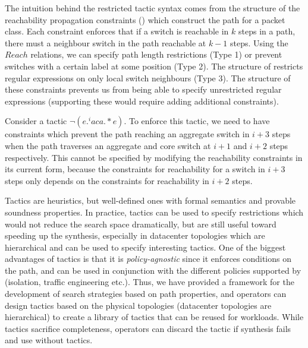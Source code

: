 The intuition behind the restricted tactic syntax comes from the structure of the reachability propagation 
constraints () which construct the path for a packet class. 
Each constraint enforces that if a switch is reachable in $k$ steps in a path,
 there must a neighbour switch in the path reachable at $k-1$ steps. 
Using the $Reach$ relations, we can specify path length restrictions (Type 1)
 or prevent switches with a certain label at some position (Type 2). 
 The structure of  restricts regular expressions on only local switch
 neighbours (Type 3).
  The structure of these constraints 
  prevents us from being able to specify unrestricted regular expressions (supporting
  these would require adding additional constraints).
  \begin{example}
  Consider a tactic $\neg(e .^i a c a .*e)$. To enforce
  this tactic, we need to have constraints which prevent the path reaching an aggregate switch in $i+3$
  steps when the path traverses an aggregate and core switch at $i+1$ and $i+2$ steps
  respectively. This cannot be specified by modifying the reachability 
  constraints in its current form, 
  because the constraints for reachability for a switch in $i + 3$ steps only depends on 
  the constraints for reachability in $i+2$ steps. 
   \end{example}

Tactics are heuristics, but well-defined ones with formal semantics and provable soundness properties.
 In practice, tactics can be used to specify restrictions which would not reduce the search space dramatically, 
but are still useful toward speeding up the synthesis, especially in datacenter topologies which are hierarchical 
 and can be used to specify interesting tactics. One of the biggest advantages
 of tactics is that it is \emph{policy-agnostic} since it enforces conditions on the path, and
 can be used in conjunction with the different policies supported by \name (isolation, traffic engineering etc.).  
 Thus, we have provided a framework for the
 development of search strategies based on path properties, and 
operators can design tactics based on the physical topologies (datacenter topologies are hierarchical)
 to create a library of tactics that can be reused for workloads.
  While tactics sacrifice completeness, operators can discard the tactic 
  if synthesis fails and use \name without tactics.

